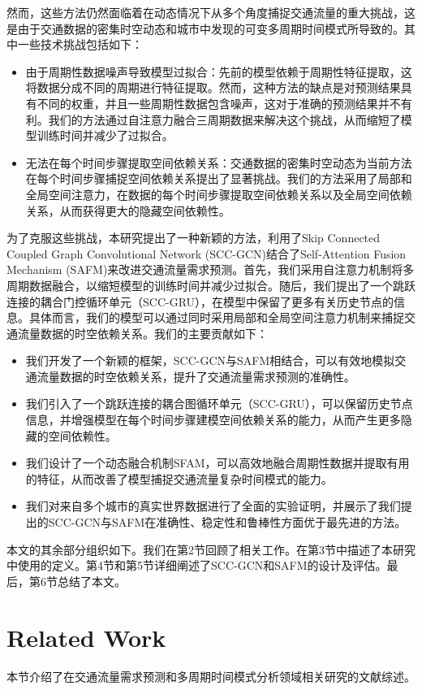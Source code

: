 \documentclass[10.5pt,compsoc,UTF8]{CjC}
\theoremstyle{mystyle}
\begin{document}
然而，这些方法仍然面临着在动态情况下从多个角度捕捉交通流量的重大挑战，这是由于交通数据的密集时空动态和城市中发现的可变多周期时间模式所导致的。其中一些技术挑战包括如下：
\begin{itemize}
	\item 由于周期性数据噪声导致模型过拟合：先前的模型依赖于周期性特征提取，这将数据分成不同的周期进行特征提取。然而，这种方法的缺点是对预测结果具有不同的权重，并且一些周期性数据包含噪声，这对于准确的预测结果并不有利。我们的方法通过自注意力融合三周期数据来解决这个挑战，从而缩短了模型训练时间并减少了过拟合。
	\item  无法在每个时间步骤提取空间依赖关系：交通数据的密集时空动态为当前方法在每个时间步骤捕捉空间依赖关系提出了显著挑战。我们的方法采用了局部和全局空间注意力，在数据的每个时间步骤提取空间依赖关系以及全局空间依赖关系，从而获得更大的隐藏空间依赖性。
\end{itemize}
为了克服这些挑战，本研究提出了一种新颖的方法，利用了Skip Connected Coupled Graph Convolutional Network (SCC-GCN)结合了Self-Attention Fusion Mechanism (SAFM)来改进交通流量需求预测。首先，我们采用自注意力机制将多周期数据融合，以缩短模型的训练时间并减少过拟合。随后，我们提出了一个跳跃连接的耦合门控循环单元（SCC-GRU），在模型中保留了更多有关历史节点的信息。具体而言，我们的模型可以通过同时采用局部和全局空间注意力机制来捕捉交通流量数据的时空依赖关系。我们的主要贡献如下：
\begin{itemize}
	\item 我们开发了一个新颖的框架，SCC-GCN与SAFM相结合，可以有效地模拟交通流量数据的时空依赖关系，提升了交通流量需求预测的准确性。
	\item 我们引入了一个跳跃连接的耦合图循环单元（SCC-GRU），可以保留历史节点信息，并增强模型在每个时间步骤建模空间依赖关系的能力，从而产生更多隐藏的空间依赖性。
	\item 我们设计了一个动态融合机制SFAM，可以高效地融合周期性数据并提取有用的特征，从而改善了模型捕捉交通流量复杂时间模式的能力。
	\item 我们对来自多个城市的真实世界数据进行了全面的实验证明，并展示了我们提出的SCC-GCN与SAFM在准确性、稳定性和鲁棒性方面优于最先进的方法。
	
\end{itemize}
本文的其余部分组织如下。我们在第2节回顾了相关工作。在第3节中描述了本研究中使用的定义。第4节和第5节详细阐述了SCC-GCN和SAFM的设计及评估。最后，第6节总结了本文。
\section{ Related Work}
本节介绍了在交通流量需求预测和多周期时间模式分析领域相关研究的文献综述。
\end{document}
